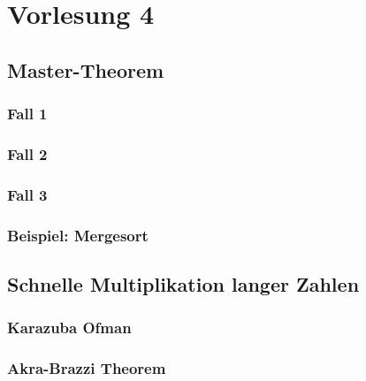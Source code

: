 \chapter{Vorlesung 4}


\section{Master-Theorem}


\subsection{Fall 1}
\subsection{Fall 2}
\subsection{Fall 3}

\subsection{Beispiel: Mergesort}


\section{Schnelle Multiplikation langer Zahlen}

\subsection{Karazuba Ofman}

\subsection{Akra-Brazzi Theorem}